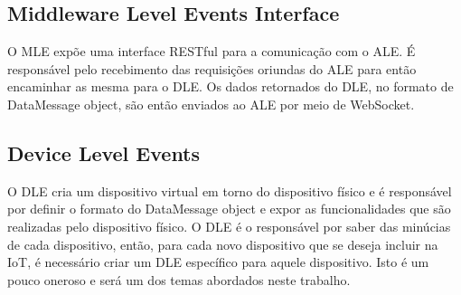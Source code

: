 \subsection{Middleware Level Events Interface}
O MLE expõe uma interface RESTful para a comunicação com o ALE. É responsável pelo recebimento das requisições
oriundas do ALE para então encaminhar as mesma para o DLE. Os dados retornados do DLE, no formato de DataMessage
object, são então enviados ao ALE por meio de WebSocket.

\subsection{Device Level Events}
O DLE cria um dispositivo virtual em torno do dispositivo físico e é responsável por definir o formato do DataMessage
object e expor as funcionalidades que são realizadas pelo dispositivo físico. O DLE é o responsável por saber das
minúcias de cada dispositivo, então, para cada novo dispositivo que se deseja incluir na IoT, é necessário criar
um DLE específico para aquele dispositivo. Isto é um pouco oneroso e será um dos temas abordados neste trabalho.
